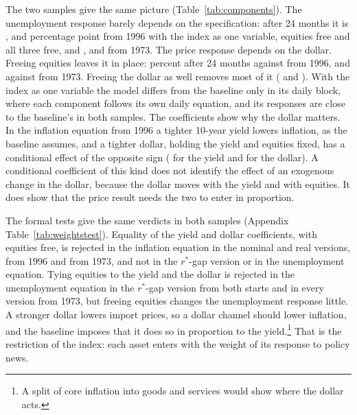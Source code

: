 \documentclass[11pt]{article}
\newcommand{\rs}{r^{*}}
\begin{document}


The two samples give the same picture (Table~\ref{tab:components}). The unemployment response barely depends on the specification: after 24 months it is ,  and  percentage point from 1996 with the index as one variable, equities free and all three free, and ,  and  from 1973. The price response depends on the dollar. Freeing equities leaves it in place:  percent after 24 months against  from 1996, and  against  from 1973. Freeing the dollar as well removes most of it ( and ). With the index as one variable the model differs from the baseline only in its daily block, where each component follows its own daily equation, and its responses are close to the baseline's in both samples. The coefficients show why the dollar matters. In the inflation equation from 1996 a tighter 10-year yield lowers inflation, as the baseline assumes, and a tighter dollar, holding the yield and equities fixed, has a conditional effect of the opposite sign ( for the yield and  for the dollar). A conditional coefficient of this kind does not identify the effect of an exogenous change in the dollar, because the dollar moves with the yield and with equities. It does show that the price result needs the two to enter in proportion.

The formal tests give the same verdicts in both samples (Appendix Table~\ref{tab:weightstest}). Equality of the yield and dollar coefficients, with equities free, is rejected in the inflation equation in the nominal and real versions, from 1996 and from 1973, and not in the $\rs$-gap version or in the unemployment equation. Tying equities to the yield and the dollar is rejected in the unemployment equation in the $\rs$-gap version from both starts and in every version from 1973, but freeing equities changes the unemployment response little. A stronger dollar lowers import prices, so a dollar channel should lower inflation, and the baseline imposes that it does so in proportion to the yield.\footnote{A split of core inflation into goods and services would show where the dollar acts.} That is the restriction of the index: each asset enters with the weight of its response to policy news.
\end{document}
